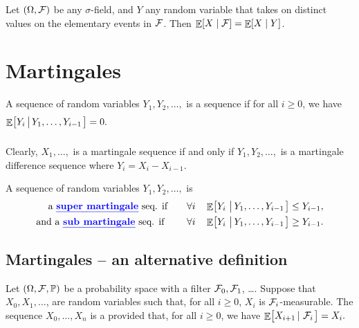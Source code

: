 \begin{defn}
    Let $(\Omega, \mathcal{F})$ be any $\sigma$-field, and $Y$ any random
    variable that takes on distinct values on the elementary events in
    $\mathcal{F}$. Then $\mathop{\mathbb{E}}\!\left[  X  \;\middle\vert\;  \mathcal{F}  \right] = \mathop{\mathbb{E}}\!\left[  X  \;\middle\vert\;  Y  \right]$.
\end{defn}


\section{Martingales}


\begin{defn}
    A sequence of random variables $Y_1, Y_2, \ldots,$ is a
     sequence if for all $i \geq 0$, we
    have
    \begin{math}
        \biggl.\mathop{\mathbb{E}}\!\left[ { Y_i \left|\, { \bigl. Y_1,\ldots, Y_{i-1}} \right.} \right] = 0.
    \end{math}
\end{defn}

Clearly, $X_1, \ldots,$ is a martingale sequence if and only if $Y_1,
Y_2, \ldots,$ is a martingale difference sequence where $Y_i = X_i -
X_{i-1}$.

\begin{defn}
    A sequence of random variables $Y_1, Y_2, \ldots,$ is
    \begin{align*}
        \text{ a \emphOnly{super martingale}\index{super martingale} seq. if} \qquad &
        \forall i \quad%
        \Ex{ Y_i \sep{ Y_1,\ldots, Y_{i-1}}} \leq Y_{i-1},\\
        \text{and a \emphOnly{sub martingale}\index{sub martingale} seq. if \qquad} &%
        \forall i \quad%
        \Ex{ Y_i \sep{ Y_1,\ldots, Y_{i-1}}} \geq Y_{i-1}.
    \end{align*}
\end{defn}


\subsection{Martingales -- an alternative definition}

\begin{defn}
    Let $(\Omega, \mathcal{F}, \mathbb{P})$ be a probability space with a
    filter $\mathcal{F}_0, \mathcal{F}_1$, \ldots. Suppose that $X_0, X_1,
    \ldots$, are random variables such that, for all $i \geq 0$, $X_i$
    is $\mathcal{F}_i$-measurable. The sequence $X_0,\ldots, X_n$ is a
     provided that, for all $i \geq 0$, we have
    \begin{math}
        \mathop{\mathbb{E}}\!\left[ { \bigl. X_{i+1} \left|\, {\,\mathcal{F}_i} \right.} \right] = X_i.
    \end{math}
\end{defn}

